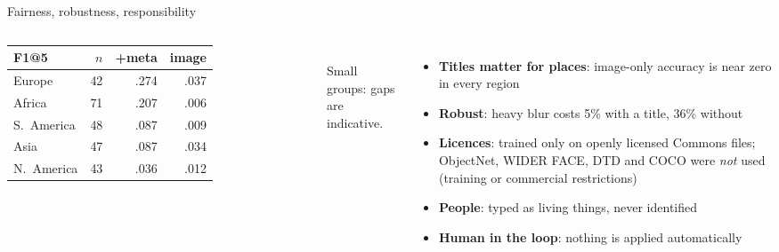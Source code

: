 \documentclass[aspectratio=169,11pt]{beamer}
\begin{document}
\begin{frame}{Fairness, robustness, responsibility}
\begin{columns}[T]
\small
\begin{tabular}{@{}lrrr@{}}
\toprule
F1@5 & $n$ & +meta & image \\ \midrule
Europe & 42 & .274 & .037 \\
Africa & 71 & .207 & .006 \\
S.\ America & 48 & .087 & .009 \\
Asia & 47 & .087 & .034 \\
N.\ America & 43 & .036 & .012 \\ \bottomrule
\end{tabular}\\[6pt]
\scriptsize\color{muted} Small groups: gaps are indicative.
\begin{itemize}\small\setlength{\itemsep}{4pt}
\item \textbf{Titles matter for places}: image-only accuracy is near zero in every region
\item \textbf{Robust}: heavy blur costs 5\% with a title, 36\% without
\item \textbf{Licences}: trained only on openly licensed Commons files; ObjectNet, WIDER FACE, DTD and COCO were \emph{not} used (training or commercial restrictions)
\item \textbf{People}: typed as living things, never identified
\item \textbf{Human in the loop}: nothing is applied automatically
\end{itemize}
\end{columns}
\end{frame}
\end{document}
